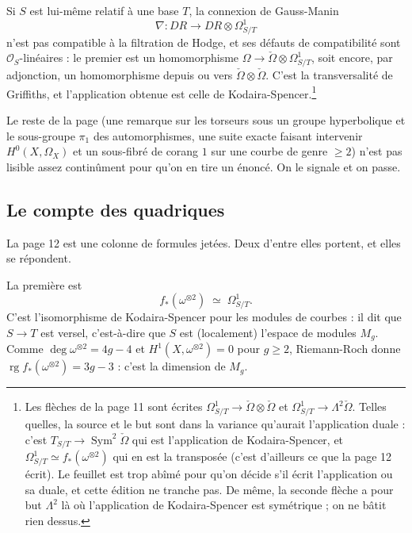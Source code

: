 \documentclass[11pt,a4paper]{article}
\begin{document}
Si $S$ est lui-même relatif à une base $T$, la connexion de Gauss-Manin
\[
  \nabla : DR \longrightarrow DR \otimes \Omega^1_{S/T}
\]
n'est pas compatible à la filtration de Hodge, et ses défauts de compatibilité
sont $\mathcal{O}_S$-linéaires : le premier est un homomorphisme
$\Omega \to \check{\Omega} \otimes \Omega^1_{S/T}$, soit encore, par
adjonction, un homomorphisme depuis ou vers $\check{\Omega} \otimes
\check{\Omega}$. C'est la transversalité de Griffiths, et l'application
obtenue est celle de Kodaira-Spencer.\footnote{Les flèches de la page 11 sont
écrites $\Omega^1_{S/T} \to \check{\Omega}\otimes\check{\Omega}$ et
$\Omega^1_{S/T} \to \Lambda^2\check{\Omega}$. Telles quelles, la source et le
but sont dans la variance qu'aurait l'application duale : c'est
$T_{S/T} \to \operatorname{Sym}^2\check{\Omega}$ qui est l'application de
Kodaira-Spencer, et $\Omega^1_{S/T} \simeq f_*(\omega^{\otimes 2})$ qui en est
la transposée (c'est d'ailleurs ce que la page 12 écrit). Le feuillet est trop
abîmé pour qu'on décide s'il écrit l'application ou sa duale, et cette édition
ne tranche pas. De même, la seconde flèche a pour but $\Lambda^2$ là où
l'application de Kodaira-Spencer est symétrique ; on ne bâtit rien dessus.}

Le reste de la page (une remarque sur les torseurs sous un groupe hyperbolique
et le sous-groupe $\pi_1$ des automorphismes, une suite exacte faisant
intervenir $H^0(X, \Omega_X)$ et un sous-fibré de corang $1$ sur une courbe de
genre $\geqslant 2$) n'est pas lisible assez continûment pour qu'on en tire
un énoncé. On le signale et on passe.

\subsection*{Le compte des quadriques}

La page 12 est une colonne de formules jetées. Deux
d'entre elles portent, et elles se répondent.

La première est
\[
  f_*(\omega^{\otimes 2}) \;\simeq\; \Omega^1_{S/T} .
\]
C'est l'isomorphisme de Kodaira-Spencer pour les modules de courbes : il dit
que $S \to T$ est versel, c'est-à-dire que $S$ est (localement) l'espace de
modules $M_g$. Comme $\deg \omega^{\otimes 2} = 4g-4$ et
$H^1(X, \omega^{\otimes 2}) = 0$ pour $g \geqslant 2$, Riemann-Roch donne
$\operatorname{rg} f_*(\omega^{\otimes 2}) = 3g-3$ : c'est la dimension de
$M_g$.
\end{document}
